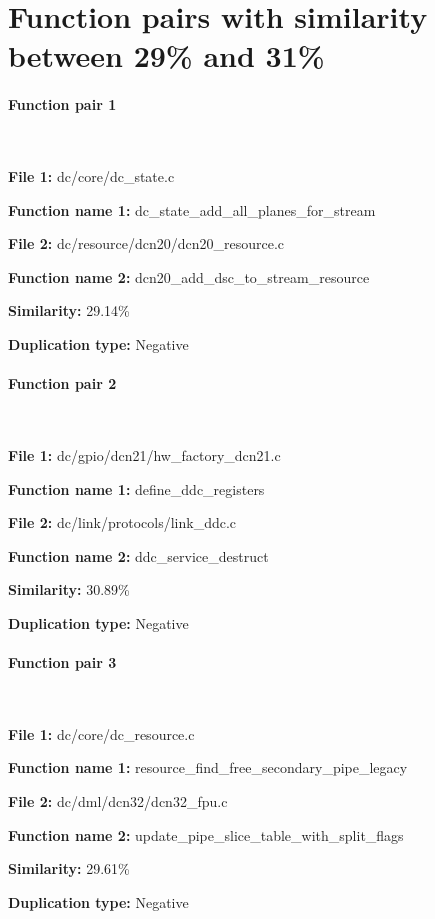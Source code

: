 \section{Function pairs with similarity between 29\% and 31\%}

\paragraph{Function pair 1 }  

\

\textbf{File 1:} dc/core/dc\_state.c

\textbf{Function name 1:} dc\_state\_add\_all\_planes\_for\_stream

\textbf{File 2:} dc/resource/dcn20/dcn20\_resource.c

\textbf{Function name 2:} dcn20\_add\_dsc\_to\_stream\_resource

\textbf{Similarity:} 29.14\%

\textbf{Duplication type:} Negative


\paragraph{Function pair 2 }  

\

\textbf{File 1:} dc/gpio/dcn21/hw\_factory\_dcn21.c

\textbf{Function name 1:} define\_ddc\_registers

\textbf{File 2:} dc/link/protocols/link\_ddc.c

\textbf{Function name 2:} ddc\_service\_destruct

\textbf{Similarity:} 30.89\%

\textbf{Duplication type:} Negative


\paragraph{Function pair 3 }  

\

\textbf{File 1:} dc/core/dc\_resource.c

\textbf{Function name 1:} resource\_find\_free\_secondary\_pipe\_legacy

\textbf{File 2:} dc/dml/dcn32/dcn32\_fpu.c

\textbf{Function name 2:} update\_pipe\_slice\_table\_with\_split\_flags

\textbf{Similarity:} 29.61\%

\textbf{Duplication type:} Negative


